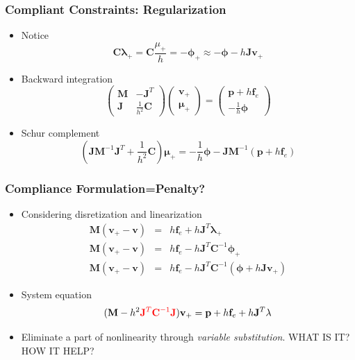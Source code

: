 \documentclass[serif,mathserif]{beamer}
\newcommand{\BOLD}[1]{\mathbf{#1}}
\newcommand{\PDIF}[2]{\frac{\partial #1}{\partial #2}}
\begin{document}
\begin{frame}
 \frametitle{Compliant Constraints: Regularization}
 \begin{itemize}
  \item Notice
  \begin{equation*}
   \BOLD{C\lambda}_+ = \BOLD{C}\frac{\mu_+}{h}=-\BOLD{\BOLD{\phi}}_+\approx-\BOLD{\phi}-h\BOLD{Jv}_+
  \end{equation*}
  \item Backward integration
    \begin{equation*}
     \begin{pmatrix}
      \BOLD{M} & -\BOLD{J}^T \\
      \BOLD{J} & \frac{1}{h^2}\BOLD{C}
     \end{pmatrix}
     \begin{pmatrix}
      \BOLD{v}_+ \\ \BOLD{\mu}_+
     \end{pmatrix}
     =
     \begin{pmatrix}
      \BOLD{p}+h\BOLD{f}_e \\ -\frac{1}{h}\BOLD{\phi}
     \end{pmatrix}
    \end{equation*}
  \item Schur complement
    \begin{equation*}
      (\BOLD{JM}^{-1}\BOLD{J}^T + \frac{1}{h^2}\BOLD{C})\BOLD{\mu}_+ = -\frac{1}{h}\BOLD{\phi}-\BOLD{JM}^{-1}(\BOLD{p}+h\BOLD{f}_e)
    \end{equation*}
 \end{itemize}
\end{frame}

\begin{frame}
 \frametitle{Compliance Formulation=Penalty?}
 \begin{itemize}
  \item Considering disretization and linearization
    \begin{eqnarray*}
      \BOLD{M}(\BOLD{v}_+-\BOLD{v}) &=& h\BOLD{f}_{e}+h\BOLD{J}^T\BOLD{\lambda}_+ \\
      \BOLD{M}(\BOLD{v}_+-\BOLD{v}) &=& h\BOLD{f}_{e}-h\BOLD{J}^T\BOLD{C}^{-1}\BOLD{\phi}_+ \\
      \BOLD{M}(\BOLD{v}_+-\BOLD{v}) &=& h\BOLD{f}_{e}-h\BOLD{J}^T\BOLD{C}^{-1}(\BOLD{\phi}+h\BOLD{Jv}_+)
    \end{eqnarray*}
  \item System equation 
    \begin{equation*}
      (\BOLD{M}-h^2{\color{red}\BOLD{J}^T\BOLD{C}^{-1}\BOLD{J}})\BOLD{v}_+ = \BOLD{p}+h\BOLD{f}_{e}+h\BOLD{J}^T\BOLD{\lambda}
    \end{equation*}
  \pause
  \TikzDraw {
    \node at (-0.4, -0.4) {\huge \color{red} $\neq \PDIF{\BOLD{f}_c}{\BOLD{x}}$};
  }
  \item Eliminate a part of nonlinearity through \textit{\color{yellow}variable substitution}. WHAT IS IT? HOW IT HELP?
 \end{itemize}
\end{frame}
\end{document}
